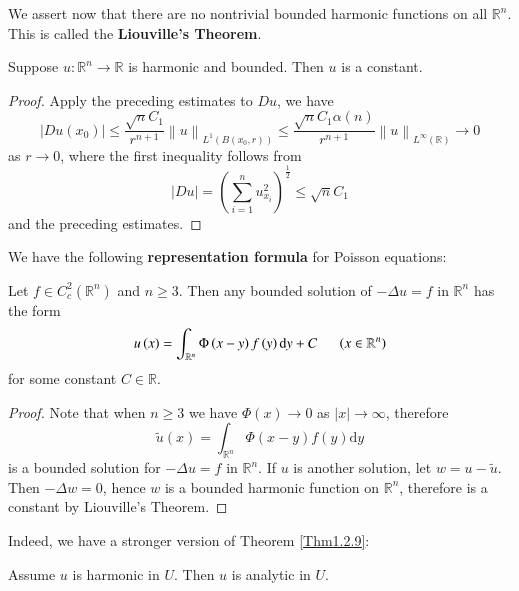 We assert now that there are no nontrivial bounded harmonic functions on all $\mathbb{R}^n$. This is called the \textbf{Liouville's Theorem}.
\begin{theorem}
Suppose $u:\mathbb{R}^n\to\mathbb{R}$ is harmonic and bounded. Then $u$ is a constant.
\end{theorem}
\begin{proof}
Apply the preceding estimates to $Du$, we have 
$$
\left| Du\left( x_0 \right) \right|\le \frac{\sqrt{n}C_1}{r^{n+1}}\left\| u \right\| _{L^1\left( B\left( x_0,r \right) \right)}\le \frac{\sqrt{n}C_1\alpha \left( n \right)}{r^{n+1}}\left\| u \right\| _{L^{\infty}\left( \mathbb{R} \right)}\rightarrow 0
$$
as $r\to 0$, where the first inequality follows from 
$$
\left| Du \right|=\left( \sum_{i=1}^n{u_{x_i}^{2}} \right) ^{\frac{1}{2}}\le \sqrt{n}C_1
$$
and the preceding estimates.
\end{proof}
We have the following \textbf{representation formula} for Poisson equations: 
\begin{theorem}
Let $f\in C_c^2(\mathbb{R}^n)$ and $n\ge 3$. Then any bounded solution of $-\Delta u=f$ in $\mathbb{R}^n$ has the form 
$$
u\left( x \right) =\int_{\mathbb{R} ^n}{\Phi \left( x-y \right) f\left( y \right) \mathrm{d}y}+C\hspace{0.5cm}\left( x\in \mathbb{R} ^n \right) 
$$
for some constant $C\in\mathbb{R}$.
\end{theorem}
\begin{proof}
Note that when $n\ge 3$ we have $\Phi(x)\to 0$ as $|x|\to\infty$, therefore 
$$
\widetilde{u}\left( x \right) =\int_{\mathbb{R} ^n}{\Phi \left( x-y \right) f\left( y \right) \mathrm{d}y}
$$
is a bounded solution for $-\Delta u=f$ in $\mathbb{R}^n$. If $u$ is another solution, let $w=u-\widetilde{u}$. Then $-\Delta w=0$, hence $w$ is a bounded harmonic function on $\mathbb{R}^n$, therefore is a constant by Liouville's Theorem.
\end{proof}
Indeed, we have a stronger version of Theorem \ref{Thm1.2.9}: 
\begin{theorem}
Assume $u$ is harmonic in $U$. Then $u$ is analytic in $U$.
\end{theorem}
